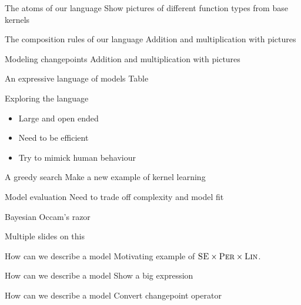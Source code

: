\begin{frame}{The atoms of our language}
  Show pictures of different function types from base kernels
\end{frame}

\begin{frame}{The composition rules of our language}
  Addition and multiplication with pictures
\end{frame}

\begin{frame}{Modeling changepoints}
  Addition and multiplication with pictures
\end{frame}

\begin{frame}{An expressive language of models}
  Table
\end{frame}

\begin{frame}{Exploring the language}
  \begin{itemize}
    \item Large and open ended
    \vspace{\baselineskip}
    \item Need to be efficient
    \vspace{\baselineskip}
    \item Try to mimick human behaviour
  \end{itemize}
\end{frame}

\begin{frame}{A greedy search}
  Make a new example of kernel learning
\end{frame}

\begin{frame}{Model evaluation}
  Need to trade off complexity and model fit
  
  Bayesian Occam's razor
  
  Multiple slides on this
\end{frame}

\begin{frame}{How can we describe a model}
  Motivating example of ${\textsc{SE}} \times {\textsc{Per}} \times {\textsc{Lin}}$.
\end{frame}

\begin{frame}{How can we describe a model}
  Show a big expression
\end{frame}

\begin{frame}{How can we describe a model}
  Convert changepoint operator
\end{frame}

